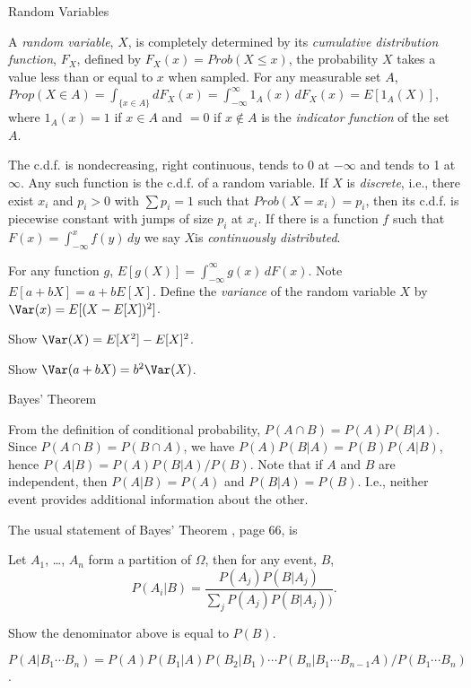 \begin{section}{Random Variables}

A {\em random variable}, $X$, is completely determined by its 
{\em cumulative distribution function}, $F_X$, defined by 
$F_X(x) = Prob(X\le x)$, the probability $X$ takes a value less than 
or equal to $x$ when sampled.
For any measurable set $A$, $Prop(X\in A) = \int_{\{x\in A\}} dF_X(x) 
= \int_{-\infty}^\infty 1_A(x)\,dF_X(x) = E[1_A(X)]$, 
where $1_A(x) = 1$ if $x\in A$ and $= 0$ if $x\not\in A$ is the
{\em indicator function} of the set $A$.

The c.d.f. is nondecreasing, right continuous, tends to 0 at
$-\infty$ and tends to 1 at $\infty$. Any such function is the
c.d.f. of a random variable. If $X$ is {\em discrete}, i.e.,
there exist $x_i$ and $p_i > 0$ with $\sum p_i = 1$ such that
$Prob(X = x_i) = p_i$, then its c.d.f. is piecewise constant with 
jumps of size $p_i$ at $x_i$. If there is a function $f$ such that 
$F(x) = \int_{-\infty}^x f(y)\,dy$ we say $X$is 
{\em continuously distributed}.

For any function $g$, $E[g(X)] = \int_{-\infty}^\infty g(x)\,dF(x)$.
Note $E[a + bX] = a + bE[X]$.
Define the {\em variance} of the random variable $X$ by
$\Var(x) = E[(X - E[X])^2]$.

\begin{exercise}
Show $\Var(X) = E[X^2] - E[X]^2$. 
\end{exercise}

\begin{exercise}
Show $\Var(a + bX) = b^2\Var(X)$.
\end{exercise}

\end{section}

\begin{section}{Bayes' Theorem}

From the definition of conditional probability, $P(A\cap B) = P(A)P(B|A)$. Since
$P(A\cap B) = P(B\cap A)$, we have $P(A)P(B|A) = P(B)P(A|B)$, hence
$P(A|B) = P(A)P(B|A)/P(B)$.
Note that if $A$ and $B$ are independent, then $P(A|B) = P(A)$ and
$P(B|A) = P(B)$. I.e., neither event provides additional information
about the other.

The usual statement of Bayes' Theorem \cite{DeGroot:1986}, page 66, is
\begin{theorem}
Let $A_1$, \dots, $A_n$ form a partition of $\Omega$, then for any event, $B$,
\begin{equation*}
	P(A_i|B) = \frac{P(A_j)P(B|A_j)}{\sum_j P(A_j)P(B|A_j))}.
\end{equation*}
\end{theorem}
\begin{exercise}
Show the denominator above is equal to $P(B)$.
\end{exercise}



$P(A|B_1\cdots B_n) = P(A)P(B_1|A)P(B_2|B_1 )\cdots P(B_n|B_1\cdots B_{n-1}A)/P(B_1\cdots B_n)$.
\end{section}

